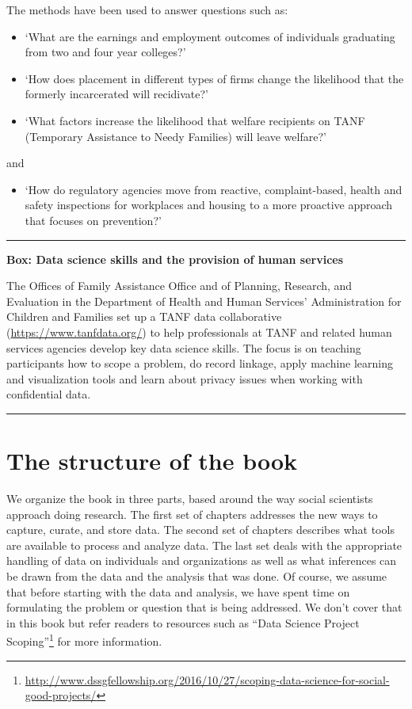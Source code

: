 \documentclass[]{krantz}
\providecommand{\tightlist}{%
  \setlength{\itemsep}{0pt}\setlength{\parskip}{0pt}}
\begin{document}
The methods have been used to answer questions such as:

\begin{itemize}
\item
  `What are the earnings and employment outcomes of individuals
  graduating from two and four year colleges?'
\item
  `How does placement in different types of firms change the likelihood
  that the formerly incarcerated will recidivate?'
\item
  `What factors increase the likelihood that welfare recipients on TANF
  (Temporary Assistance to Needy Families) will leave welfare?'
\end{itemize}

and

\begin{itemize}
\tightlist
\item
  `How do regulatory agencies move from reactive, complaint-based,
  health and safety inspections for workplaces and housing to a more
  proactive approach that focuses on prevention?'
\end{itemize}

\begin{center}\rule{0.5\linewidth}{\linethickness}\end{center}

\textbf{Box: Data science skills and the provision of human services}

The Offices of Family Assistance Office and of Planning, Research, and
Evaluation in the Department of Health and Human Services'
Administration for Children and Families set up a TANF data
collaborative (\url{https://www.tanfdata.org/}) to help professionals at
TANF and related human services agencies develop key data science
skills. The focus is on teaching participants how to scope a problem, do
record linkage, apply machine learning and visualization tools and learn
about privacy issues when working with confidential data.

\begin{center}\rule{0.5\linewidth}{\linethickness}\end{center}

\section{The structure of the book}\label{the-structure-of-the-book}

We organize the book in three parts, based around the way social
scientists approach doing research. The first set of chapters addresses
the new ways to capture, curate, and store data. The second set of
chapters describes what tools are available to process and analyze data.
The last set deals with the appropriate handling of data on individuals
and organizations as well as what inferences can be drawn from the data
and the analysis that was done. Of course, we assume that before
starting with the data and analysis, we have spent time on formulating
the problem or question that is being addressed. We don't cover that in
this book but refer readers to resources such as ``Data Science Project
Scoping''\footnote{\url{http://www.dssgfellowship.org/2016/10/27/scoping-data-science-for-social-good-projects/}}
for more information.
\end{document}
